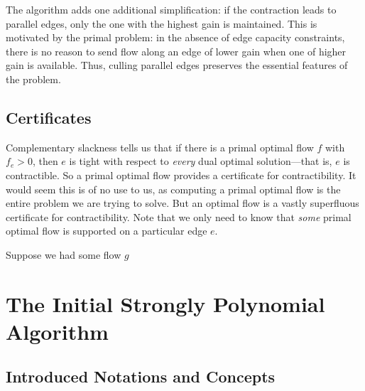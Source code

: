 \documentclass[12pt]{article}
\theoremstyle{definition}
\begin{document}
	The algorithm adds one additional simplification: if the contraction leads to parallel edges,
	only the one with the highest gain is maintained. This is motivated by the primal problem: in
	the absence of edge capacity constraints, there is no reason to send flow along an edge of
	lower gain when one of higher gain is available. Thus, culling parallel edges preserves the
	essential features of the problem.
	
	\subsection{Certificates}
	Complementary slackness tells us that if there is a primal optimal flow $f$ with
	$f_e > 0$, then $e$ is tight with respect to \emph{every} dual optimal solution---that
	is, $e$ is contractible. So a primal optimal flow provides a certificate for contractibility.
	It would seem this is of no use to us, as computing a primal optimal flow is the entire
	problem we are trying to solve. But an optimal flow is a vastly superfluous certificate
	for contractibility. Note that we only need to know that \emph{some}
	primal optimal flow is supported on a particular edge $e$.
	
	Suppose we had some flow $g$
	

\section{The Initial Strongly Polynomial Algorithm}
\subsection{Introduced Notations and Concepts}
\end{document}
